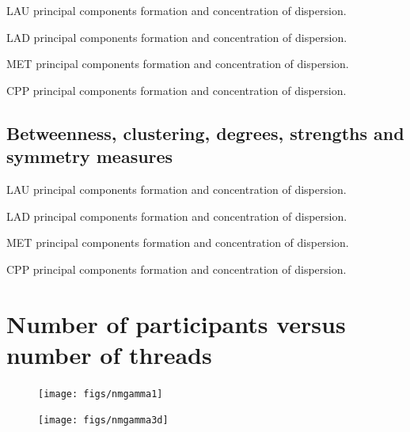 \documentclass[%
 aip,
 jmp,%
 amsmath,amssymb,
 reprint,%
 floatfix,
]{revtex4-1}
\begin{document}
\begin{table}[!h]
	\caption{LAU principal components formation and concentration of dispersion.}
	\footnotesize
	
\label{tab:pcain}
\end{table}
\begin{table}[!h]
	\caption{LAD principal components formation and concentration of dispersion.}
	\footnotesize
	
\label{tab:pcain}
\end{table}
\begin{table}[!h]
	\caption{MET principal components formation and concentration of dispersion.}
	\footnotesize
	
\label{tab:pcain}
\end{table}
\begin{table}[!h]
	\caption{CPP principal components formation and concentration of dispersion.}
	\footnotesize
	
\label{tab:pcain}
\end{table}


\FloatBarrier
\subsection{Betweenness, clustering, degrees, strengths and symmetry measures}

\begin{table}[!h]
	\caption{LAU principal components formation and concentration of dispersion.}
	\footnotesize
	
\label{tab:pcain}
\end{table}
\begin{table}[!h]
	\caption{LAD principal components formation and concentration of dispersion.}
	\footnotesize
	
\label{tab:pcain}
\end{table}
\begin{table}[!h]
	\caption{MET principal components formation and concentration of dispersion.}
	\footnotesize
	
\label{tab:pcain}
\end{table}
\begin{table}[!h]
	\caption{CPP principal components formation and concentration of dispersion.}
	\footnotesize
	
\label{tab:pcain}
\end{table}

\section{Number of participants versus number of threads}\label{si:nmgamma}
\begin{figure}
   \centering
        \texttt{[image: figs/nmgamma1]}
	\label{fig:nmgamma}
\end{figure}
\begin{figure}
   \centering
        \texttt{[image: figs/nmgamma3d]}
	\label{fig:nmgamma3d}
\end{figure}
\end{document}
